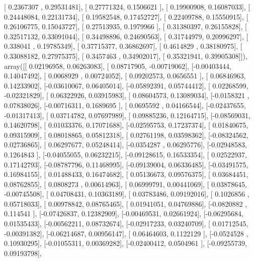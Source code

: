 \documentclass{article}
\begin{document}
       [ 0.2367307 ,  0.29531481],
       [ 0.27771324,  0.1506621 ],
       [ 0.19900908,  0.16087033],
       [ 0.24448084,  0.22131734],
       [ 0.19582548,  0.17452727],
       [ 0.22409788,  0.15550915],
       [ 0.26106775,  0.15043727],
       [ 0.27513935,  0.1979966 ],
       [ 0.31380397,  0.26155828],
       [ 0.32517132,  0.33091044],
       [ 0.34498896,  0.24690563],
       [ 0.31744979,  0.20996297],
       [ 0.338041  ,  0.19785349],
       [ 0.37715377,  0.36862697],
       [ 0.4614829 ,  0.38180975],
       [ 0.33088182,  0.27975375],
       [ 0.3457463 ,  0.34902017],
       [ 0.35321941,  0.39905308]]), array([[ 0.02196958,  0.06263083],
       [ 0.08717905, -0.00719062],
       [-0.00403444,  0.14047492],
       [ 0.0068929 ,  0.00724052],
       [ 0.09202573,  0.0656551 ],
       [ 0.06846963,  0.14233902],
       [-0.03610067,  0.06405014],
       [-0.05892391,  0.05744412],
       [ 0.02268599, -0.02321829],
       [ 0.06322926,  0.03915983],
       [ 0.08604573,  0.13089034],
       [-0.0158321 ,  0.07838026],
       [-0.00716311,  0.1689695 ],
       [ 0.0695592 ,  0.04166544],
       [-0.02437655, -0.01317413],
       [ 0.03714782,  0.07697989],
       [ 0.09885236,  0.12164715],
       [-0.08569031,  0.14620798],
       [ 0.01033376,  0.17071688],
       [-0.02595753,  0.17237374],
       [ 0.01840675,  0.09315909],
       [ 0.08018865,  0.05812318],
       [ 0.02761198,  0.03598362],
       [-0.08324562,  0.02736865],
       [ 0.06297677,  0.05248414],
       [-0.0354287 ,  0.06295776],
       [-0.02948583,  0.1264843 ],
       [-0.04055055,  0.06232215],
       [-0.09128615,  0.16533354],
       [ 0.02522937,  0.17142793],
       [-0.08787796,  0.11468995],
       [-0.09139004,  0.06336485],
       [-0.03491575,  0.16984155],
       [ 0.01488433,  0.16474682],
       [ 0.05136673,  0.09576375],
       [ 0.03684451,  0.08762855],
       [ 0.0808273 ,  0.00614963],
       [ 0.06999791,  0.00441069],
       [ 0.03878645, -0.00745508],
       [ 0.04708431,  0.10363189],
       [ 0.03783486,  0.09192016],
       [ 0.1026856 ,  0.05718033],
       [ 0.00978842,  0.08765465],
       [ 0.01941051,  0.04769886],
       [-0.0820882 ,  0.114541  ],
       [-0.07426837,  0.12382909],
       [-0.00469531,  0.02661924],
       [-0.06295684,  0.01535433],
       [-0.00562211,  0.08732674],
       [-0.02917233,  0.03240709],
       [ 0.01712545, -0.00391382],
       [-0.06214687,  0.00956147],
       [ 0.06464603,  0.1122129 ],
       [-0.0524528 ,  0.10930295],
       [-0.01055311,  0.00369282],
       [-0.02400412,  0.0504961 ],
       [-0.09255739,  0.09193798],
\end{document}

